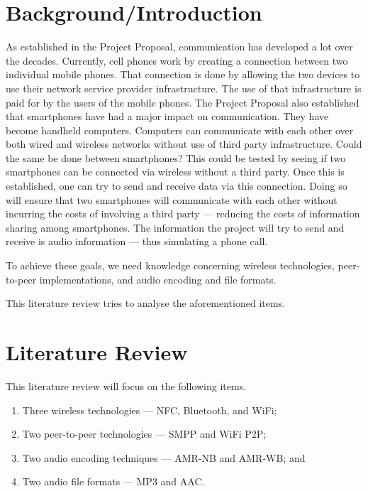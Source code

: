 \documentclass[12pt,svgnames,smaller]{article} %
\begin{document}
	
	\clearpage
		
	
	\section{ \textbf{ Background/Introduction } }
	
	As established in the Project Proposal, communication has developed a lot over the decades. Currently, cell phones work by creating a connection between two individual mobile phones. That connection is done by allowing the two devices to use their network service provider infrastructure. The use of that infrastructure is paid for by the users of the mobile phones. 
	The Project Proposal also established that smartphones have had a major impact on communication. They have become handheld computers. Computers can communicate with each other over both wired and wireless networks without use of third party infrastructure. Could the same be done between smartphones? This could be tested by seeing if two smartphones can be connected via wireless without a third party. Once this is established, one can try to send and receive data via this connection. Doing so will ensure that two smartphones will communicate with each other without incurring the costs of involving a third party --– reducing the costs of information sharing among smartphones. The information the project will try to send and receive is audio information –-- thus simulating a phone call. 
	
	To achieve these goals, we need knowledge concerning wireless technologies, peer-to-peer implementations, and audio encoding and file formats. 
	
	This literature review tries to analyse the aforementioned items.
	
	
	
	
	\section{ \textbf{ Literature Review } } 
	
	This literature review will focus on the following items.
	
	\begin{enumerate}
		\item Three wireless technologies --- NFC, Bluetooth, and WiFi;
		\item Two peer-to-peer technologies --- SMPP and WiFi P2P;
		\item Two audio encoding techniques --- AMR-NB and AMR-WB; and
		\item Two audio file formats --- MP3 and AAC.
	\end{enumerate}
	
\end{document}

